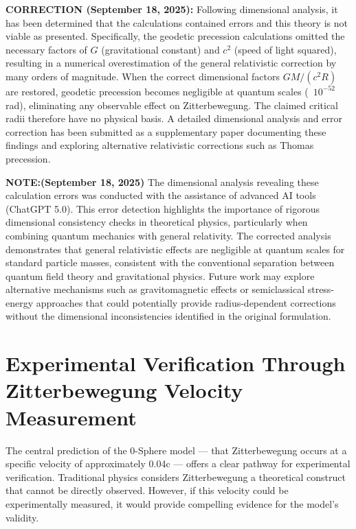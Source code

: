 \documentclass[12pt,letterpaper]{article} %
\begin{document}
\vspace{0.5cm}
\noindent\textbf{CORRECTION (September 18, 2025):} Following dimensional analysis, it has been determined that the calculations contained errors and this theory is not viable as presented. Specifically, the geodetic precession calculations omitted the necessary factors of $G$ (gravitational constant) and $c^2$ (speed of light squared), resulting in a numerical overestimation of the general relativistic correction by many orders of magnitude. When the correct dimensional factors $GM/(c^2R)$ are restored, geodetic precession becomes negligible at quantum scales (~$10^{-52}$ rad), eliminating any observable effect on Zitterbewegung. The claimed critical radii therefore have no physical basis. A detailed dimensional analysis and error correction has been submitted as a supplementary paper documenting these findings and exploring alternative relativistic corrections such as Thomas precession.

\vspace{0.3cm}
\noindent\textbf{NOTE:(September 18, 2025)} The dimensional analysis revealing these calculation errors was conducted with the assistance of advanced AI tools (ChatGPT 5.0). This error detection highlights the importance of rigorous dimensional consistency checks in theoretical physics, particularly when combining quantum mechanics with general relativity. The corrected analysis demonstrates that general relativistic effects are negligible at quantum scales for standard particle masses, consistent with the conventional separation between quantum field theory and gravitational physics. Future work may explore alternative mechanisms such as gravitomagnetic effects or semiclassical stress-energy approaches that could potentially provide radius-dependent corrections without the dimensional inconsistencies identified in the original formulation.

\section{Experimental Verification Through Zitterbewegung Velocity Measurement}

The central prediction of the 0-Sphere model --- that Zitterbewegung occurs at a specific velocity of approximately 0.04c --- offers a clear pathway for experimental verification\cite{hanamura2025}. Traditional physics considers Zitterbewegung a theoretical construct that cannot be directly observed. However, if this velocity could be experimentally measured, it would provide compelling evidence for the model's validity.
\end{document}
